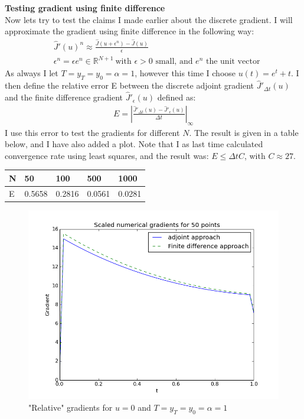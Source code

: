 \documentclass[11pt,a4paper]{report}
\begin{document}
\\
\\
\textbf{Testing gradient using finite difference}
\\
Now lets try to test the claims I made earlier about the discrete gradient. I will approximate the gradient using finite difference in the following way:
\begin{align*}
&\hat{J}'(u)^n \approx \frac{\hat{J}(u+\epsilon^n)-\hat{J}(u)}{\epsilon} \\
&\epsilon^n=\epsilon e^n \in \mathbb{R}^{N+1} \ \text{with $\epsilon>0$ small, and $e^n$ the unit vector}
\end{align*} 
As always I let $T=y_T=y_0=\alpha=1$, however this time I choose $u(t)=e^t+t$. I then define the relative error E between the discrete adjoint gradient $\hat{J}'_{\Delta t}(u)$ and the finite difference gradient $\hat{J}'_{\epsilon}(u)$ defined as:
\begin{align*}
E=|\frac{\hat{J}'_{\Delta t}(u)-\hat{J}'_{\epsilon}(u)}{\Delta t}|_{\infty}
\end{align*}
I use this error to test the gradients for different $N$. The result is given in a table below, and I have also added a plot. Note that I as last time calculated convergence rate using least squares, and the result was: $E\leq \Delta tC$, with $C\approx27$.
\begin{center}
    \begin{tabular}{| l | l | l | l | l |}
    \hline
    N & 50 & 100  & 500 & 1000 \\ \hline
    E & 0.5658 &0.2816 &0.0561 & 0.0281	\\ \hline
    \end{tabular}
\end{center}
\begin{figure}
  \includegraphics[width=\linewidth]{finite_diff_plot.png}
  \caption{"Relative" gradients for $u=0$ and $T=y_T=y_0=\alpha=1$}
  \label{Fig 2}
\end{figure}
\end{document}
